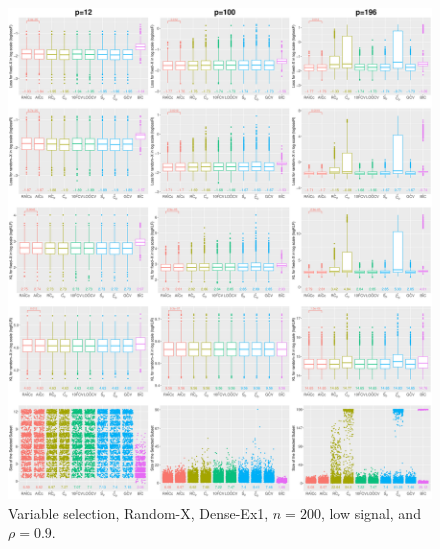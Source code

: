 \begin{figure}[!ht]
\centering
\includegraphics[width=\textwidth]{figures/supplement/randomx/subset_selection/Dense-Ex1_n200_lsnr_rho09.eps}
\caption{Variable selection, Random-X, Dense-Ex1, $n=200$, low signal, and $\rho=0.9$.}
\end{figure}
\clearpage
